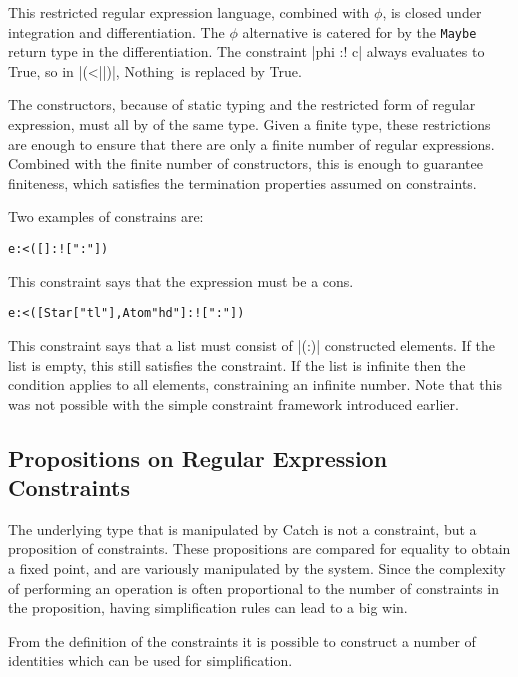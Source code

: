 \documentclass[preprint]{sigplanconf}
\newcommand{\T}[1]{\texttt{#1}}
\newcommand{\C}[1]{\textsf{#1}}
\newenvironment{code}{\begin{alltt}\small}{\end{alltt}}
\begin{document}
This restricted regular expression language, combined with $\phi$, is closed under integration and differentiation. The $\phi$ alternative is catered for by the \T{Maybe} return type in the differentiation. The constraint |phi :! c| always evaluates to True, so in |(<||)|, \C{Nothing}\ is replaced by True.

The constructors, because of static typing and the restricted form of regular expression, must all by of the same type.  Given a finite type, these restrictions are enough to ensure that there are only a finite number of regular expressions. Combined with the finite number of constructors, this is enough to guarantee finiteness, which satisfies the termination properties assumed on constraints.

Two examples of constrains are:

\begin{code}
e :< ([] :! [":"])
\end{code}

This constraint says that the expression must be a cons.

\begin{code}
e :< ([Star ["tl"], Atom "hd"] :! [":"])
\end{code}

This constraint says that a list must consist of |(:)| constructed elements. If the list is empty, this still satisfies the constraint. If the list is infinite then the condition applies to all elements, constraining an infinite number. Note that this was not possible with the simple constraint framework introduced earlier.

\subsection{Propositions on Regular Expression Constraints}

The underlying type that is manipulated by Catch is not a constraint, but a proposition of constraints. These propositions are compared for equality to obtain a fixed point, and are variously manipulated by the system. Since the complexity of performing an operation is often proportional to the number of constraints in the proposition, having simplification rules can lead to a big win.

From the definition of the constraints it is possible to construct a number of identities which can be used for simplification.
\end{document}
